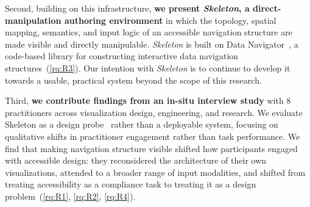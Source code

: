 \documentclass[12pt]{cmuthesis}
\begin{document}
Second, building on this infrastructure, \textbf{we present \textit{Skeleton}, a direct-manipulation authoring environment} in which the topology, spatial mapping, semantics, and input logic of an accessible navigation structure are made visible and directly manipulable. \textit{Skeleton} is built on Data Navigator~\cite{Elavsky2023}, a code-based library for constructing interactive data navigation structures~(\ref{rq:R3}). Our intention with \textit{Skeleton} is to continue to develop it towards a usable, practical system beyond the scope of this research.
 
Third, \textbf{we contribute findings from an in-situ interview study} with 8 practitioners across visualization design, engineering, and research. We evaluate Skeleton as a design probe~\cite{Hammad2024GameAware,Hutchinson2003TechnologyProbes} rather than a deployable system, focusing on qualitative shifts in practitioner engagement rather than task performance. We find that making navigation structure visible shifted how participants engaged with accessible design: they reconsidered the architecture of their own visualizations, attended to a broader range of input modalities, and shifted from treating accessibility as a compliance task to treating it as a design problem~(\ref{rq:R1}, \ref{rq:R2}, \ref{rq:R4}).



\end{document}
